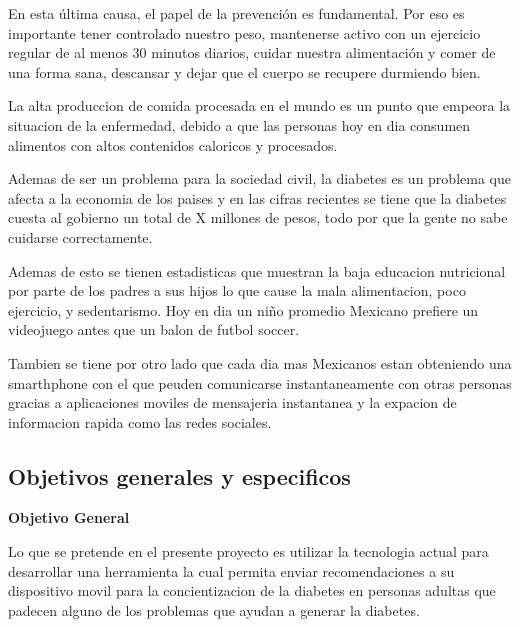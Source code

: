 En esta última causa, el papel de la prevención es fundamental. Por eso es importante tener controlado nuestro peso, mantenerse activo con un ejercicio regular de al menos 30 minutos diarios, cuidar nuestra alimentación y comer de una forma sana, descansar y dejar que el cuerpo se recupere durmiendo bien.
\vspace{0.50cm}

La alta produccion de comida procesada en el mundo es un punto que empeora la situacion de la enfermedad, debido a que las personas hoy en dia consumen alimentos con altos contenidos caloricos y procesados.
\vspace{0.50cm}

Ademas de ser un problema para la sociedad civil, la diabetes es un problema que afecta a la economia de los paises y en las cifras recientes se tiene que la diabetes cuesta al gobierno un total de X millones de pesos, todo por que la gente no sabe cuidarse correctamente.
\vspace{0.50cm}

Ademas de esto se tienen estadisticas que muestran la baja educacion nutricional por parte de los padres a sus hijos lo que cause la mala alimentacion, poco ejercicio, y sedentarismo. Hoy en dia un niño promedio Mexicano prefiere un videojuego antes que un balon de futbol soccer.
\vspace{0.50cm}

Tambien se tiene por otro lado que cada dia mas Mexicanos estan obteniendo una smarthphone con el que peuden comunicarse instantaneamente con otras personas gracias a aplicaciones moviles de mensajeria instantanea y la expacion de informacion rapida como las redes sociales.
\vspace{0.50cm}




\subsection{Objetivos generales y especificos} 

\textbf{Objetivo General}

Lo que se pretende en el presente proyecto es utilizar la tecnologia actual para desarrollar una herramienta la cual permita enviar recomendaciones a su dispositivo movil para la concientizacion de la diabetes en personas adultas que padecen alguno de los problemas que ayudan a generar la diabetes.
\vspace{0.50cm}

